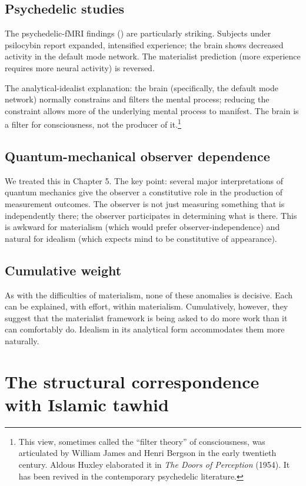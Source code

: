 \subsection{Psychedelic studies}

The psychedelic-fMRI findings ()
are particularly striking. Subjects under psilocybin report
expanded, intensified experience; the brain shows decreased activity
in the default mode network. The materialist prediction (more
experience requires more neural activity) is reversed.

The analytical-idealist explanation: the brain (specifically, the
default mode network) normally constrains and filters the mental
process; reducing the constraint allows more of the underlying
mental process to manifest. The brain is a filter for consciousness,
not the producer of it.\footnote{This view, sometimes called the
``filter theory'' of consciousness, was articulated by William
James and Henri Bergson in the early twentieth century. Aldous
Huxley elaborated it in \emph{The Doors of Perception} (1954). It
has been revived in the contemporary psychedelic literature.}

\subsection{Quantum-mechanical observer dependence}

We treated this in Chapter 5. The key point: several major
interpretations of quantum mechanics give the observer a
constitutive role in the production of measurement outcomes. The
observer is not just measuring something that is independently
there; the observer participates in determining what is there. This
is awkward for materialism (which would prefer observer-independence)
and natural for idealism (which expects mind to be constitutive of
appearance).

\subsection{Cumulative weight}

As with the difficulties of materialism, none of these anomalies is
decisive. Each can be explained, with effort, within materialism.
Cumulatively, however, they suggest that the materialist framework
is being asked to do more work than it can comfortably do. Idealism
in its analytical form accommodates them more naturally.

\section{The structural correspondence with Islamic tawhid}
\label{sec:tawhid-correspondence}

